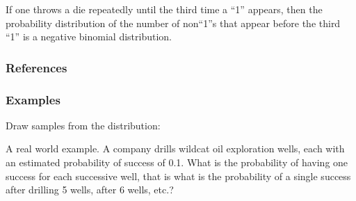 \documentclass[letterpaper,10pt,english]{sphinxmanual}
\begin{document}
\begin{fulllineitems}
\sphinxAtStartPar
If one throws a die repeatedly until the third time a “1” appears,
then the probability distribution of the number of non\sphinxhyphen{}“1”s that
appear before the third “1” is a negative binomial distribution.
\subsubsection*{References}
\subsubsection*{Examples}

\sphinxAtStartPar
Draw samples from the distribution:

\sphinxAtStartPar
A real world example. A company drills wild\sphinxhyphen{}cat oil
exploration wells, each with an estimated probability of
success of 0.1.  What is the probability of having one success
for each successive well, that is what is the probability of a
single success after drilling 5 wells, after 6 wells, etc.?

\begin{sphinxVerbatim}[commandchars=\\\{\}]
    
     
       
     
\end{sphinxVerbatim}

\end{fulllineitems}

\end{document}

